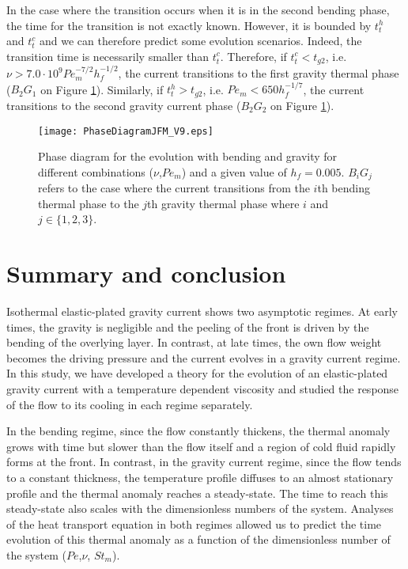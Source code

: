 In  the case  where the  transition occurs  when it  is in  the second
bending  phase, the  time for  the  transition is  not exactly  known.
However, it  is bounded by  $t_t^h$ and  $t_t^c$ and we  can therefore
predict  some evolution  scenarios.   Indeed, the  transition time  is
necessarily smaller than $t_t^c$.   Therefore, if $t_t^c<t_{g2}$, i.e.
$\nu>7.0\cdot 10^9Pe_m^{-7/2} h_f^{-1/2}$,  the current transitions to
the    first   gravity    thermal    phase    ($B_2G_1$   on    Figure
\ref{C3-Phase_Diagram_ELASGRAV}).  Similarly,  if $t_t^h>t_{g2}$, i.e.
$Pe_m<650h_f^{-1/7}$, the  current transitions  to the  second gravity
current phase ($B_2G_2$ on Figure \ref{C3-Phase_Diagram_ELASGRAV}).
\begin{figure}[h!]
  \begin{center}
    \graphicspath{ {/Users/thorey/Documents/These/Projet/Refroidissement/Skin_Model/Figure/JFM_V13/} }
    \texttt{[image: PhaseDiagramJFM\_V9.eps]}
    \caption{Phase diagram for the  evolution with bending and gravity
      for different  combinations ($\nu$,$Pe_m$) and a  given value of
      $h_f =  0.005$.  $B_iG_j$ refers  to the case where  the current
      transitions from  the $i$th bending  thermal phase to  the $j$th
      gravity thermal phase where $i$ and $j \in \{1,2,3\}$.}
    \label{C3-Phase_Diagram_ELASGRAV}
  \end{center}
\end{figure}
\section{Summary and conclusion}
\label{C3-sec:conclusion}

Isothermal  elastic-plated   gravity  current  shows   two  asymptotic
regimes.  At early times, the gravity is negligible and the peeling of
the  front is  driven  by  the bending  of  the  overlying layer.   In
contrast,  at late  times, the  own  flow weight  becomes the  driving
pressure and the current evolves in a gravity current regime.  In this
study,  we   have  developed  a   theory  for  the  evolution   of  an
elastic-plated gravity current with  a temperature dependent viscosity
and studied  the response of  the flow to  its cooling in  each regime
separately.

In the bending regime, since the flow constantly thickens, the thermal
anomaly grows with  time but slower than the flow  itself and a region
of cold fluid rapidly forms at  the front. In contrast, in the gravity
current  regime, since  the flow  tends to  a constant  thickness, the
temperature profile diffuses  to an almost stationary  profile and the
thermal  anomaly  reaches a  steady-state.   The  time to  reach  this
steady-state also scales with the dimensionless numbers of the system.
Analyses of the heat transport equation  in both regimes allowed us to
predict the  time evolution of this  thermal anomaly as a  function of
the dimensionless number of the system ($Pe$,$\nu$, $St_m$).

